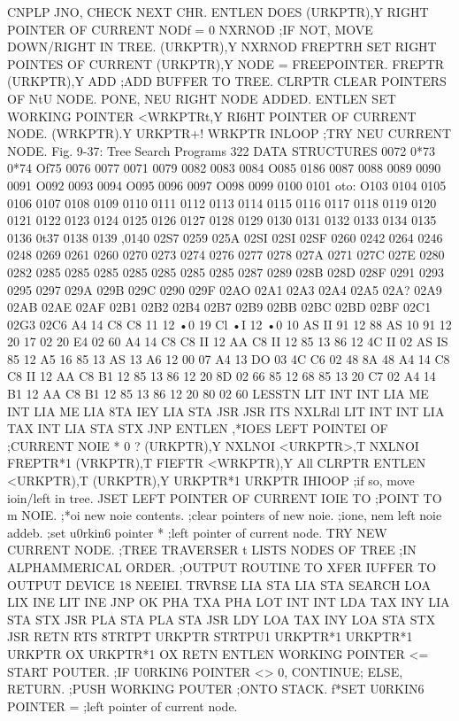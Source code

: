 \documentclass{book}
\begin{document}
{{{{{{{{{{{{{{{{{{{{{{{{{{{{{{{{{{{{{{{{{{{{{{{CNPLP JNO, CHECK NEXT CHR.
ENTLEN {DOES
(URKPTR),Y {RIGHT POINTER OF CURRENT NODf = 0
NXRNOD ;IF NOT, MOVE DOWN/RIGHT IN TREE.
(URKPTR),Y
NXRNOD
FREPTRH {SET RIGHT POINTES OF CURRENT
(URKPTR),Y {NODE = FREEPOINTER.
FREPTR
(URKPTR),Y
ADD ;ADD BUFFER TO TREE.
CLRPTR {CLEAR POINTERS OF NtU NODE.
{PONE, NEU RIGHT NODE ADDED.
ENTLEN {SET WORKING POINTER
<WRKPTRt,Y{ RI6HT POINTER OF CURRENT NODE.
(WRKPTR).Y
URKPTR+!
WRKPTR
INLOOP ;TRY NEU CURRENT NODE.
Fig. 9-37: Tree Search Programs
322
DATA STRUCTURES
0072
0*73
0*74
Of75
0076
0077
0071
0079
0082
0083
0084
O085
0186
0087
0088
0089
0090
0091
O092
0093
0094
O095
0096
0097
O098
0099
0100
0101
oto:
O103
0104
0105
0106
0107
0108
0109
0110
0111
0112
0113
0114
0115
0116
0117
0118
0119
0120
0121
0122
0123
0124
0125
0126
0127
0128
0129
0130
0131
0132
0133
0134
0135
0136
0t37
0138
0139
,0140
02S7
0259
025A
02SI
02SI
02SF
0260
0242
0264
0246
0248
0269
0261
0260
0270
0273
0274
0276
0277
0278
027A
0271
027C
027E
0280
0282
0285
0285
0285
0285
0285
0285
0285
0287
0289
028B
028D
028F
0291
0293
0295
0297
029A
029B
029C
0290
029F
02AO
02A1
02A3
02A4
02A5
02A?
02A9
02AB
02AE
02AF
02B1
02B2
02B4
02B7
02B9
02BB
02BC
02BD
02BF
02C1
02G3
02C6
A4 14
C8
C8
11 12
•0 19
Cl
•I 12
•0 10
AS II
91 12
88
AS 10
91 12
20 17 02
20 E4 02
60
A4 14
C8
C8
II 12
AA
C8
II 12
85 13
86 12
4C II 02
AS IS
85 12
A5 16
85 13
AS 13
A6 12
00 07
A4 13
DO 03
4C C6 02
48
8A
48
A4 14
C8
C8
II 12
AA
C8
B1 12
85 13
86 12
20 8D 02
66
85 12
68
85 13
20 C7 02
A4 14
B1 12
AA
C8
B1 12
85 13
86 12
20 80 02
60
LESSTN LIT
INT
INT
LIA
ME
INT
LIA
ME
LIA
8TA
IEY
LIA
STA
JSR
JSR
ITS
NXLRdl LIT
INT
INT
LIA
TAX
INT
LIA
STA
STX
JNP
ENTLEN ,*IOES LEFT POINTEI OF
;CURRENT NOIE * 0 ?
(URKPTR),Y
NXLNOI
<URKPTR>,T
NXLNOI
FREPTR*1
(VRKPTR),T
FIEFTR
<WRKPTR),Y
All
CLRPTR
ENTLEN
<URKPTR),T
(URKPTR),Y
URKPTR*1
URKPTR
IHIOOP
;if so, move ioin/left in tree.
JSET LEFT POINTER OF CURRENT IOIE TO
;POINT TO m NOIE.
;*oi new noie contents.
;clear pointers of new noie.
;ione, nem left noie addeb.
;set u0rkin6 pointer *
;left pointer of current node.
{TRY NEW CURRENT NODE.
;TREE TRAVERSER t LISTS NODES OF TREE
;IN ALPHAMMERICAL ORDER.
;OUTPUT ROUTINE TO XFER IUFFER TO OUTPUT
DEVICE 18 NEEIEI.
TRVRSE LIA
STA
LIA
STA
SEARCH LOA
LIX
INE
LIT
INE
JNP
OK PHA
TXA
PHA
LOT
INT
INT
LDA
TAX
INY
LIA
STA
STX
JSR
PLA
STA
PLA
STA
JSR
LDY
LOA
TAX
INY
LOA
STA
STX
JSR
RETN RTS
8TRTPT
URKPTR
STRTPU1
URKPTR*1
URKPTR*1
URKPTR
OX
URKPTR*1
OX
RETN
ENTLEN
{WORKING POINTER <= START POUTER.
;IF U0RKIN6 POINTER <> 0,
{CONTINUE;
{ELSE, RETURN.
;PUSH WORKING POUTER
;ONTO STACK.
f*SET U0RKIN6 POINTER =
;left pointer of current node.
}}}}}}}}}}}}}}}}}}}}}}}}}}}}}}}}}}}}}}}}}}}}}}}}}}}}}}}}}}}
\end{document}
